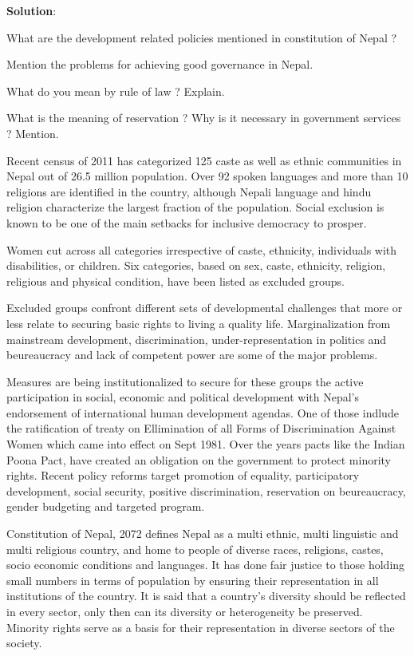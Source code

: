 \documentclass[
  openany]{book}
\newcommand{\question}{\item}
\newenvironment{solution}{ {\bfseries Solution}:}{}
\begin{document}
\begin{questions}
\begin{solution}
\end{solution}

\question What are the development related policies mentioned in constitution of Nepal ?

\question Mention the problems for achieving good governance in Nepal.

\question What do you mean by rule of law ? Explain.

\question What is the meaning of reservation ? Why is it necessary in government services ? Mention.

Recent census of 2011 has categorized 125 caste as well as ethnic communities in Nepal out of 26.5 million population. Over 92 spoken languages and more than 10 religions are identified in the country, although Nepali language and hindu religion characterize the largest fraction of the population. Social exclusion is known to be one of the main setbacks for inclusive democracy to prosper.

Women cut across all categories irrespective of caste, ethnicity, individuals with disabilities, or children. Six categories, based on sex, caste, ethnicity, religion, religious and physical condition, have been listed as excluded groups.

Excluded groups confront different sets of developmental challenges that more or less relate to securing basic rights to living a quality life. Marginalization from mainstream development, discrimination, under-representation in politics and beureaucracy and lack of competent power are some of the major problems.

Measures are being institutionalized to secure for these groups the active participation in social, economic and political development with Nepal's endorsement of international human development agendas. One of those indlude the ratification of treaty on Ellimination of all Forms of Discrimination Against Women which came into effect on Sept 1981. Over the years pacts like the Indian Poona Pact, have created an obligation on the government to protect minority rights. Recent policy reforms target promotion of equality, participatory development, social security, positive discrimination, reservation on beureaucracy, gender budgeting and targeted program.

Constitution of Nepal, 2072 defines Nepal as a multi ethnic, multi linguistic and multi religious country, and home to people of diverse races, religions, castes, socio economic conditions and languages. It has done fair justice to those holding small numbers in terms of population by ensuring their representation in all institutions of the country. It is said that a country’s diversity should be reflected in every sector, only then can its diversity or heterogeneity be preserved. Minority rights serve as a basis for their representation in diverse sectors of the society. 


\end{questions}
\end{document}
